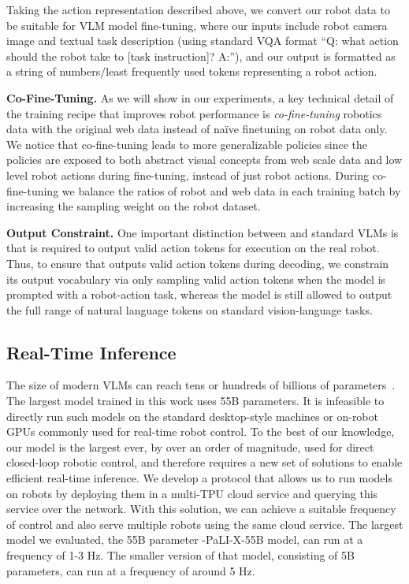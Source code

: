 Taking the action representation described above, we convert our robot data to be suitable for VLM model fine-tuning, where our inputs include robot camera image and textual task description (using standard VQA format ``Q: what action should the robot take to [task instruction]? A:''), and our output is formatted as a string of numbers/least frequently used tokens representing a robot action.

\textbf{Co-Fine-Tuning.} As we will show in our experiments, a key technical detail of the training recipe that improves robot performance is \textit{co-fine-tuning} robotics data with the original web data instead of na\"ive finetuning on robot data only. 
We notice that co-fine-tuning leads to more generalizable policies since the policies are exposed to both abstract visual concepts from web scale data and low level robot actions during fine-tuning, instead of just robot actions.
During co-fine-tuning we balance the ratios of robot and web data in each training batch by increasing the sampling weight on the robot dataset. 

\textbf{Output Constraint.} One important distinction between \methodname and standard VLMs is that \methodname is required to output valid action tokens for execution on the real robot. 
Thus, to ensure that \methodname outputs valid action tokens during decoding, we constrain its output vocabulary via only sampling valid action tokens when the model is prompted with a robot-action task, whereas the model is still allowed to output the full range of natural language tokens on standard vision-language tasks. 

\subsection{Real-Time Inference}

The size of modern VLMs can reach tens or hundreds of billions of parameters~\citep{chen2023palix,driess2023palm}. The largest model trained in this work uses 55B parameters. It is infeasible to directly run such models on the standard desktop-style machines or on-robot GPUs commonly used for real-time robot control. To the best of our knowledge, our model is the largest ever, by over an order of magnitude, used for direct closed-loop robotic control, and therefore requires a new set of solutions to enable efficient real-time inference. We develop a protocol that allows us to run \methodname models on robots by deploying them in a multi-TPU cloud service and querying this service over the network. With this solution, we can achieve a suitable frequency of control and also serve multiple robots using the same cloud service. The largest model we evaluated, the 55B parameter \methodname-PaLI-X-55B model, can run at a frequency of 1-3 Hz. The smaller version of that model, consisting of 5B parameters, can run at a frequency of around 5 Hz. 

